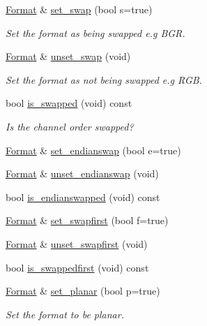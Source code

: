 \begin{DoxyCompactItemize}
\item 
\hyperlink{class_c_m_s_1_1_format}{Format} \& \hyperlink{class_c_m_s_1_1_format_a5438f6336d252ddbbb973739d121f593}{set\+\_\+swap} (bool s=true)
\begin{DoxyCompactList}\small\item\em Set the format as being swapped e.\+g B\+GR. \end{DoxyCompactList}\item 
\hyperlink{class_c_m_s_1_1_format}{Format} \& \hyperlink{class_c_m_s_1_1_format_a3dc342e4e9b121ae8344a50eb53de093}{unset\+\_\+swap} (void)
\begin{DoxyCompactList}\small\item\em Set the format as not being swapped e.\+g R\+GB. \end{DoxyCompactList}\item 
bool \hyperlink{class_c_m_s_1_1_format_a8f92904c0d69c17cc978abf3cd6c22fb}{is\+\_\+swapped} (void) const
\begin{DoxyCompactList}\small\item\em Is the channel order swapped? \end{DoxyCompactList}\item 
\hyperlink{class_c_m_s_1_1_format}{Format} \& \hyperlink{class_c_m_s_1_1_format_a65bf5b0b92c59a67bb8bf2b6578a4ec0}{set\+\_\+endianswap} (bool e=true)
\item 
\hyperlink{class_c_m_s_1_1_format}{Format} \& \hyperlink{class_c_m_s_1_1_format_abb7b1e1f28cb8ca2b259ec7cb8ad1d56}{unset\+\_\+endianswap} (void)
\item 
bool \hyperlink{class_c_m_s_1_1_format_a738bc50d2f6d18bca81708d3832dba97}{is\+\_\+endianswapped} (void) const
\item 
\hyperlink{class_c_m_s_1_1_format}{Format} \& \hyperlink{class_c_m_s_1_1_format_af2e7142d868f25be862cbb38f3132fb1}{set\+\_\+swapfirst} (bool f=true)
\item 
\hyperlink{class_c_m_s_1_1_format}{Format} \& \hyperlink{class_c_m_s_1_1_format_acd34b91ec29eb33b725007990f2b30d3}{unset\+\_\+swapfirst} (void)
\item 
bool \hyperlink{class_c_m_s_1_1_format_a4e551b1ac30e7149d5bb7de19b80832e}{is\+\_\+swappedfirst} (void) const
\item 
\hyperlink{class_c_m_s_1_1_format}{Format} \& \hyperlink{class_c_m_s_1_1_format_a08b6f3cfa807eeacd4b15d1d315577a5}{set\+\_\+planar} (bool p=true)
\begin{DoxyCompactList}\small\item\em Set the format to be planar. \end{DoxyCompactList}\item 

\end{DoxyCompactItemize}
